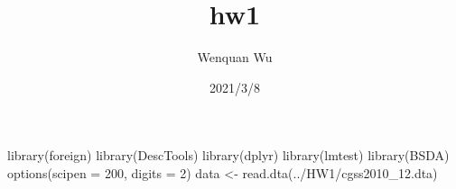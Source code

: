 \documentclass[
]{article}
\title{hw1}
\author{Wenquan Wu}
\date{2021/3/8}
\newenvironment{Shaded}{\begin{snugshade}}{\end{snugshade}}
\newcommand{\AttributeTok}[1]{\textcolor[rgb]{0.77,0.63,0.00}{#1}}
\newcommand{\DecValTok}[1]{\textcolor[rgb]{0.00,0.00,0.81}{#1}}
\newcommand{\FunctionTok}[1]{\textcolor[rgb]{0.00,0.00,0.00}{#1}}
\newcommand{\NormalTok}[1]{#1}
\newcommand{\OtherTok}[1]{\textcolor[rgb]{0.56,0.35,0.01}{#1}}
\newcommand{\StringTok}[1]{\textcolor[rgb]{0.31,0.60,0.02}{#1}}
\begin{document}
\maketitle

\begin{Shaded}
\begin{Highlighting}[]
\FunctionTok{library}\NormalTok{(foreign)}
\FunctionTok{library}\NormalTok{(DescTools)}
\FunctionTok{library}\NormalTok{(dplyr)}
\FunctionTok{library}\NormalTok{(lmtest)}
\FunctionTok{library}\NormalTok{(BSDA)}
\FunctionTok{options}\NormalTok{(}\AttributeTok{scipen =} \DecValTok{200}\NormalTok{, }\AttributeTok{digits =} \DecValTok{2}\NormalTok{) }
\NormalTok{data }\OtherTok{\textless{}{-}} \FunctionTok{read.dta}\NormalTok{(}\StringTok{\textquotesingle{}../HW1/cgss2010\_12.dta\textquotesingle{}}\NormalTok{) }
\end{Highlighting}
\end{Shaded}
\end{document}
